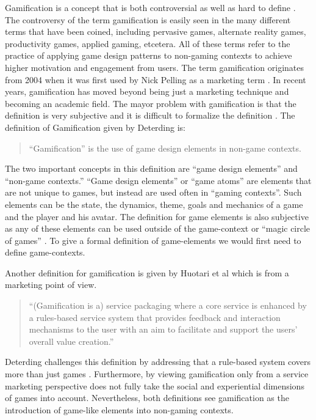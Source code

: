 \documentclass[11pt]{article}
\begin{document}
Gamification is a concept that is both controversial \cite{McGonigal2011} as well as hard to define \cite{Deterding2011}. The controversy of the term gamification is easily seen in the many different terms that have been coined, including pervasive games, alternate reality games, productivity games, applied gaming, etcetera. All of these terms refer to the practice of applying game design patterns to non-gaming contexts to achieve higher motivation and engagement from users. The term gamification originates from 2004 when it was first used by Nick Pelling as a marketing term \cite{Huotari2012}. In recent years, gamification has moved beyond being just a marketing technique and becoming an academic field. The mayor problem with gamification is that the definition is very subjective and it is difficult to formalize the definition \cite{Huotari2012, Deterding2011}. 
%
The definition of Gamification given by Deterding is:
\begin{quote}
	``Gamification'' is the use of game design elements in non-game contexts. 
\end{quote}

The two important concepts in this definition are ``game design elements'' and ``non-game contexts.'' ``Game design elements'' or ``game atoms'' \cite{Deterding2011, Brathwaite2008} are elements that are not unique to games, but instead are used often in ``gaming contexts''. Such elements can be the state, the dynamics, theme, goals and mechanics of a game and the player and his avatar. The definition for game elements is also subjective as any of these elements can be used outside of the game-context or ``magic circle of games'' \cite{Huizinga}. To give a formal definition of game-elements we would first need to define game-contexts.

Another definition for gamification is given by Huotari et al \cite{Huotari2012} which is from a marketing point of view.
\begin{quote}
	“(Gamification is a) service packaging where a core service is
enhanced by a rules-based service system that provides feedback
and interaction mechanisms to the user with an aim to facilitate
and support the users’ overall value creation.”
\end{quote}

Deterding challenges this definition by addressing that a rule-based system covers more than just games \cite{Deterding2011}. Furthermore, by viewing gamification only from a service marketing perspective does not fully take the social and experiential dimensions of games into account. Nevertheless, both definitions see gamification as the introduction of game-like elements into non-gaming contexts.
\end{document}

